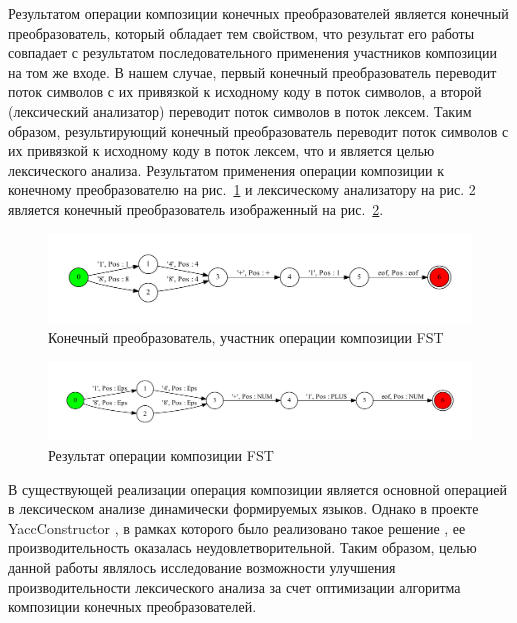 Результатом операции композиции конечных преобразователей является конечный преобразователь, который обладает тем свойством, что результат его работы совпадает с результатом последовательного применения участников композиции на том же входе. В нашем случае, первый конечный преобразователь переводит поток символов с их привязкой к исходному коду в поток символов, а второй (лексический анализатор) переводит поток символов в поток лексем. Таким образом, результирующий конечный преобразователь переводит поток символов с их привязкой к исходному коду в поток лексем, что и является целью лексического анализа. Результатом применения операции композиции к конечному преобразователю на рис.~\ref{operand_composition} и лексическому анализатору на рис. 2 является конечный преобразователь изображенный на рис.~\ref{composition}.

\begin{figure}[h]
\centering
\includegraphics[width=\textwidth]{Baygeldin/pictures/example_.pdf}
\caption{Конечный преобразователь, участник операции композиции FST}
\label{operand_composition}
\end{figure}

\begin{figure}[h]
\centering
\includegraphics[width=\textwidth]{Baygeldin/pictures/res_.pdf}
\caption{Результат операции композиции FST}
\label{composition}
\end{figure}

В существующей реализации операция композиции является основной операцией в лексическом анализе динамически формируемых языков. Однако в проекте YaccConstructor \cite{yacc_article,yacc_www}, в рамках которого было реализовано такое решение \cite{polubelova}, ее производительность оказалась неудовлетворительной. Таким образом, целью данной работы являлось исследование возможности улучшения производительности лексического анализа за счет оптимизации алгоритма композиции конечных преобразователей.
